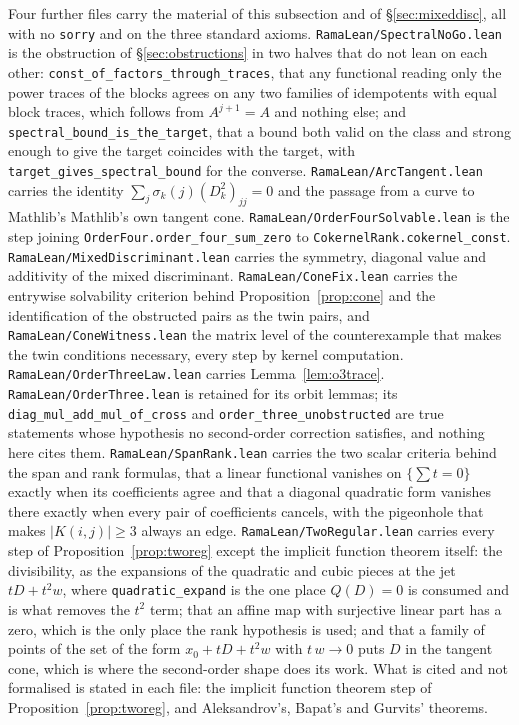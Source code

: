 \documentclass[11pt]{article}
\theoremstyle{remark}
\begin{document}
Four further files carry the material of this subsection and of \S\ref{sec:mixeddisc}, all with no
\texttt{sorry} and on the three standard axioms. \texttt{RamaLean/SpectralNoGo.lean} is the
obstruction of \S\ref{sec:obstructions} in two halves that do not lean on each other:
\texttt{const\_of\_factors\_through\_traces}, that any functional reading only the power traces of
the blocks agrees on any two families of idempotents with equal block traces, which follows from
$A^{j+1}=A$ and nothing else; and \texttt{spectral\_bound\_is\_the\_target}, that a bound both valid
on the class and strong enough to give the target coincides with the target, with
\texttt{target\_gives\_spectral\_bound} for the converse. \texttt{RamaLean/ArcTangent.lean} carries
the identity $\sum_j\sigma_k(j)(D_k^2)_{jj}=0$ and the passage from a curve to Mathlib's
Mathlib's own tangent cone. \texttt{RamaLean/OrderFourSolvable.lean} is the step joining
\texttt{OrderFour.order\_four\_sum\_zero} to \texttt{CokernelRank.cokernel\_const}.
\texttt{RamaLean/MixedDiscriminant.lean} carries the symmetry, diagonal value and additivity of the
mixed discriminant. \texttt{RamaLean/ConeFix.lean} carries the entrywise solvability criterion behind
Proposition~\ref{prop:cone} and the identification of the obstructed pairs as the twin pairs, and
\texttt{RamaLean/ConeWitness.lean} the matrix level of the counterexample that makes the twin
conditions necessary, every step by kernel computation.
\texttt{RamaLean/OrderThreeLaw.lean} carries Lemma~\ref{lem:o3trace}.
\texttt{RamaLean/OrderThree.lean} is retained for its orbit lemmas; its
\texttt{diag\_mul\_add\_mul\_of\_cross} and \texttt{order\_three\_unobstructed} are true statements
whose hypothesis no second-order correction satisfies, and nothing here cites them. \texttt{RamaLean/SpanRank.lean} carries the two scalar criteria behind the span
and rank formulas, that a linear functional vanishes on $\{\sum t=0\}$ exactly when its coefficients
agree and that a diagonal quadratic form vanishes there exactly when every pair of coefficients
cancels, with the pigeonhole that makes $|K(i,j)|\ge3$ always an edge.
\texttt{RamaLean/TwoRegular.lean} carries every step of Proposition~\ref{prop:tworeg} except the
implicit function theorem itself: the divisibility, as the expansions of the quadratic and cubic
pieces at the jet $tD+t^2w$, where \texttt{quadratic\_expand} is the one place $Q(D)=0$ is consumed
and is what removes the $t^2$ term; that an affine map with surjective linear part has a zero, which
is the only place the rank hypothesis is used; and that a family of points of the set of the form
$x_0+tD+t^2w$ with $t\,w\to0$ puts $D$ in the tangent cone, which is where the second-order shape
does its work. What is cited and not formalised is stated in each file: the implicit function theorem
step of Proposition~\ref{prop:tworeg}, and Aleksandrov's, Bapat's and Gurvits' theorems.
\end{document}
